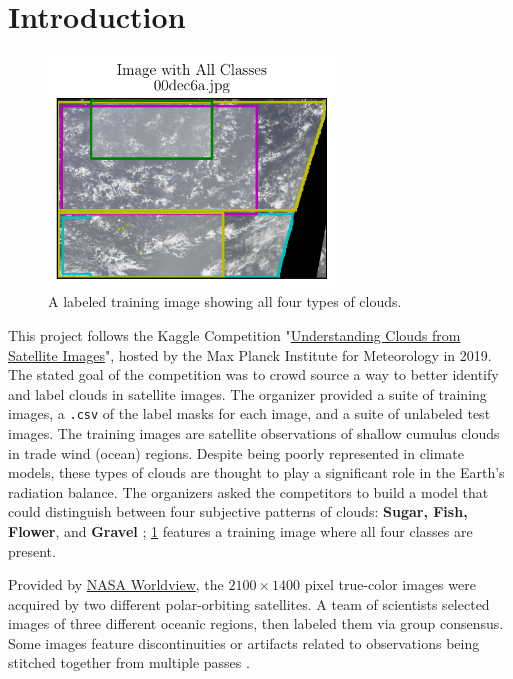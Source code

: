 \section{Introduction}
\begin{figure}
    \centering
    \includegraphics[width=3in]{figs/all_labels.pdf}
    \caption{A labeled training image showing all four types of clouds.}
    \label{fig:all_labels}
\end{figure}
%
This project follows the Kaggle Competition "\href{https://www.kaggle.com/competitions/understanding_cloud_organization/overview}{Understanding Clouds from Satellite Images}", hosted by the Max Planck Institute for Meteorology in 2019. The stated goal of the competition was to crowd source a way to better identify and label clouds in satellite images. The organizer provided a suite of training images, a \texttt{.csv} of the label masks for each image, and a suite of unlabeled test images. The training images are satellite observations of shallow cumulus clouds in trade wind (ocean) regions. Despite being poorly represented in climate models, these types of clouds are thought to play a significant role in the Earth's radiation balance. The organizers asked the competitors to build a model that could distinguish between four subjective patterns of clouds: \textbf{Sugar, Fish, Flower}, and \textbf{Gravel} \cite{rasp_CombiningCrowdsourcingDeep_2020, maxplanckinstituteformeteorology_UnderstandingCloudsSatellite_}; \cref{fig:all_labels} features a training image where all four classes are present. 

Provided by \href{https://worldview.earthdata.nasa.gov/}{NASA Worldview}, the \(2100 \times 1400\) pixel true-color images were acquired by two different polar-orbiting satellites.  A team of scientists selected images of three different oceanic regions, then labeled them via group consensus. Some images feature discontinuities or artifacts related to observations being stitched together from multiple passes \cite{maxplanckinstituteformeteorology_UnderstandingCloudsSatellite_}. 
%

